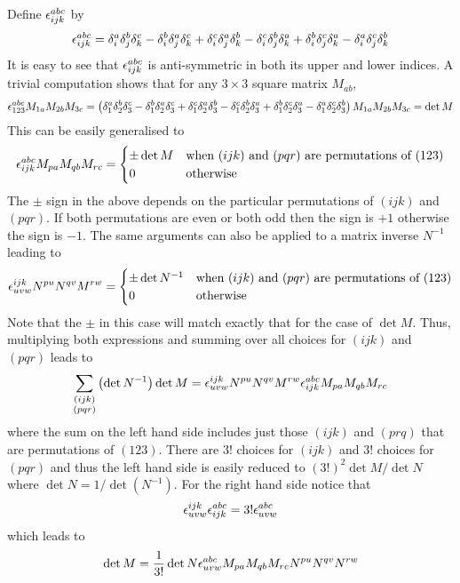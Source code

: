 \documentclass[12pt]{cdblatex}
\begin{document}
Define $\epsilon^{abc}_{ijk}$ by
\begin{align}
   \epsilon^{abc}_{ijk} =
        \delta^a_i \delta^b_j \delta^c_k - \delta^b_i \delta^a_j \delta^c_k
      + \delta^c_i \delta^a_j \delta^b_k - \delta^c_i \delta^b_j \delta^a_k
      + \delta^b_i \delta^c_j \delta^a_k - \delta^a_i \delta^c_j \delta^b_k
\end{align}
It is easy to see that $\epsilon^{abc}_{ijk}$ is anti-symmetric in both its upper and lower
indices. A trivial computation shows that for any $3{}\times{}3$ square matrix $M_{ab}$,
\begin{align}
   \epsilon^{abc}_{123} M_{1a} M_{2b} M_{3c}
   = \left(
          \delta^a_1 \delta^b_2 \delta^c_3 - \delta^b_1 \delta^a_2 \delta^c_3
        + \delta^c_1 \delta^a_2 \delta^b_3 - \delta^c_1 \delta^b_2 \delta^a_3
        + \delta^b_1 \delta^c_2 \delta^a_3 - \delta^a_1 \delta^c_2 \delta^b_3
     \right)M_{1a} M_{2b} M_{3c}
   = \det M
\end{align}
This can be easily generalised to
\begin{align}
   \epsilon^{abc}_{ijk} M_{pa} M_{qb} M_{rc}
   =
   \begin{cases}
      \pm \det M &\text{when $(ijk)$ and $(pqr)$ are permutations of $(123)$}\\
      0 & \text{otherwise}
   \end{cases}
\end{align}
The $\pm$ sign in the above depends on the particular permutations of $(ijk)$ and $(pqr)$. If
both permutations are even or both odd then the sign is $+1$ otherwise the sign is $-1$.
The same arguments can also be applied to a matrix inverse $N^{-1}$ leading to
\begin{align}
   \epsilon^{ijk}_{uvw} N^{pu} N^{qv} M^{rw}
   =
   \begin{cases}
      \pm \det {N^{-1}} &\text{when $(ijk)$ and $(pqr)$ are permutations of $(123)$}\\
      0 & \text{otherwise}
   \end{cases}
\end{align}
Note that the $\pm$ in this case will match exactly that for the case of $\det M$. Thus,
multiplying both expressions and summing over all choices for $(ijk)$ and $(pqr)$ leads
to
\begin{align}
   \sum_{\substack{(ijk)\\(pqr)}}\left(\det N^{-1}\right) \det M
   = \epsilon^{ijk}_{uvw} N^{pu} N^{qv} M^{rw} \epsilon^{abc}_{ijk} M_{pa} M_{qb} M_{rc}
\end{align}
where the sum on the left hand side includes just those $(ijk)$ and $(prq)$ that are
permutations of $(123)$. There are $3!$ choices for $(ijk)$ and $3!$ choices for
$(pqr)$ and thus the left hand side is easily reduced to $(3!)^2 \det M/\det N$ where
$\det N = 1/\det (N^{-1})$. For the right hand side notice that
\begin{align}
   \epsilon^{ijk}_{uvw} \epsilon^{abc}_{ijk} = 3! \epsilon^{abc}_{uvw}
\end{align}
which leads to
\begin{align}
   \det M = \frac{1}{3!} \det N \epsilon^{abc}_{uvw} M_{pa} M_{qb} M_{rc} N^{pu} N^{qv} N^{rw}
\end{align}
\end{document}
